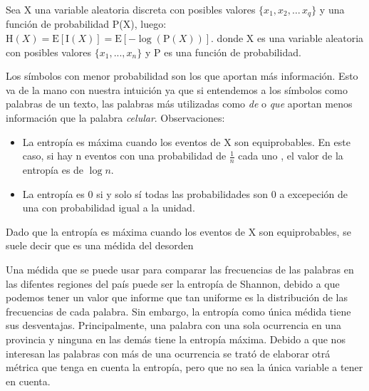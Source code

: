 Sea X una variable aleatoria discreta con posibles valores $\{x_1, x_2, \dots\, x_q\}$ y una función de probabilidad P(X), luego:
${\displaystyle \mathrm {H} (X)=\mathrm {E} [\mathrm {I} (X)]=\mathrm {E} [-\log(\mathrm {P} (X))].}$
donde X es una variable aleatoria con posibles valores $\{x_1, ... , x_n\}$ y P es una función de probabilidad.

Los símbolos con menor probabilidad son los que aportan más información. Esto va de la mano con nuestra intuición ya que si entendemos a los símbolos como palabras de un texto, las palabras más utilizadas como \textit{de} o \textit{que} aportan menos información que la palabra \textit{celular}. 
Observaciones:
\begin{itemize}
    \item La entropía es máxima cuando los eventos de X son equiprobables. En este caso, si hay n eventos con una probabilidad de $\frac{1}{n}$ cada uno , el valor de la entropía es de $\log n$.
    \item La entropía es 0 si y solo sí todas las probabilidades son 0 a excepeción de una con probabilidad igual a la unidad. 
\end{itemize}

Dado que la entropía es máxima cuando los eventos de X son equiprobables, se suele decir que es una médida del desorden

Una médida que se puede usar para comparar las frecuencias de las palabras en las difentes regiones del país puede ser la entropía de Shannon, debido a que podemos tener un valor que informe que tan uniforme es la distribución de las frecuencias de cada palabra.
Sin embargo, la entropía como única médida tiene sus desventajas. Principalmente, una palabra con una sola ocurrencia en una provincia y ninguna en las demás tiene la entropía máxima. Debido a que nos interesan las palabras con más de una ocurrencia se trató de elaborar otrá métrica que tenga en cuenta la entropía, pero que no sea la única variable a tener en cuenta.


%

